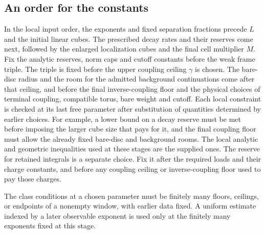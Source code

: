 \documentclass[11pt,letterpaper,reqno]{amsart}
\numberwithin{equation}{section}
\theoremstyle{definition}
\theoremstyle{remark}
\begin{document}
\subsection{An order for the constants}

In the local input order, the exponents and fixed separation fractions
precede $L$ and the initial linear cubes. The prescribed decay rates
and their reserves come next, followed by the enlarged localization
cubes and the final cell multiplier $M$. Fix the analytic reserves,
norm caps and cutoff constants before the weak frame triple. The
triple is fixed before the upper coupling ceiling $\gamma$ is chosen.
The bare-disc radius and the room for the admitted background
continuations come after that ceiling, and before the final
inverse-coupling floor and the physical choices of terminal coupling,
compatible torus, bare weight and cutoff. Each local constraint is
checked at its last free parameter after substitution of quantities
determined by earlier choices. For example, a lower bound on a decay
reserve must be met before imposing the larger cube size that pays
for it, and the final coupling floor must allow the already fixed
bare-disc and background rooms. The local analytic and geometric
inequalities used at these stages are the supplied ones.
The reserve for retained integrals is a separate choice. Fix it after
the required loads and their charge constants, and before any coupling
ceiling or inverse-coupling floor used to pay those charges.

The class conditions at a chosen parameter must be finitely many
floors, ceilings, or endpoints of a nonempty window, with earlier
data fixed. A uniform estimate indexed by a later observable
exponent is used only at the finitely many exponents fixed at this
stage.
\end{document}
